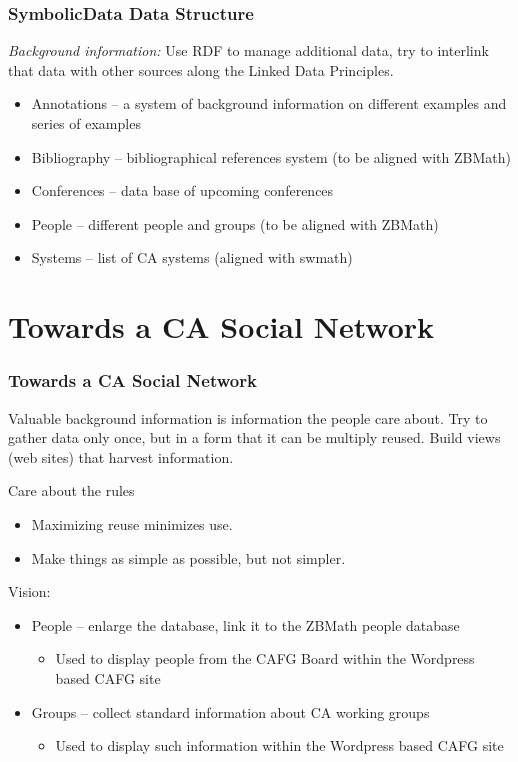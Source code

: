 \documentclass{beamer}
\begin{document}
\begin{frame}\frametitle{SymbolicData Data Structure}
\emph{Background information:} Use RDF to manage additional data, try to
interlink that data with other sources along the Linked Data Principles.
\begin{itemize}
\item Annotations -- a system of background information on different examples
  and series of examples
\item Bibliography -- bibliographical references system (to be aligned with
  ZBMath)
\item Conferences -- data base of upcoming conferences
\item People -- different people and groups (to be aligned with ZBMath)
\item Systems -- list of CA systems (aligned with swmath) 
\end{itemize}
\end{frame}

\section{Towards a CA Social Network}
\begin{frame}\frametitle{Towards a CA Social Network}
Valuable background information is information the people care about. Try to
gather data only once, but in a form that it can be multiply reused. Build
views (web sites) that harvest information.

Care about the rules
\begin{itemize}
\item Maximizing reuse minimizes use.
\item Make things as simple as possible, but not simpler. 
\end{itemize}
Vision:
\begin{itemize}
\item People -- enlarge the database, link it to the ZBMath people database
\begin{itemize}
\item Used to display people from the CAFG Board within the Wordpress based
  CAFG site
\end{itemize}
\item Groups -- collect standard information about CA working groups 
\begin{itemize}
\item Used to display such information within the Wordpress based CAFG site
\end{itemize}
\end{itemize}
\end{frame}
\end{document}
